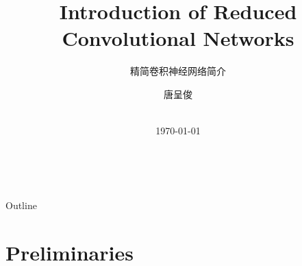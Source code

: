 

\newcommand{\balA}[1][1]{BAL$^\mathup{I}_{#1:#1}$\xspace}
\newcommand{\unbalA}[1][n]{UNBAL$^\mathup{I}_{1:#1}$\xspace}
\newcommand{\balB}[1][1]{BAL$^\mathup{II}_{#1:#1}$\xspace}
\newcommand{\unbalB}[1][n]{UNBAL$^\mathup{II}_{#1:1}$\xspace}



\title{Introduction of Reduced Convolutional Networks}

\subtitle{精简卷积神经网络简介}

\author[唐呈俊]{%
	唐呈俊
} %


\date{%
	\\[\medskipamount]
	\textmd{\today}%
}






\begin{frame}[standout]{~}

	\titlepage%

\end{frame}


\begin{frame}[standout]{Outline}

	\medskip
	\tableofcontents

\end{frame}






\section{Preliminaries}

